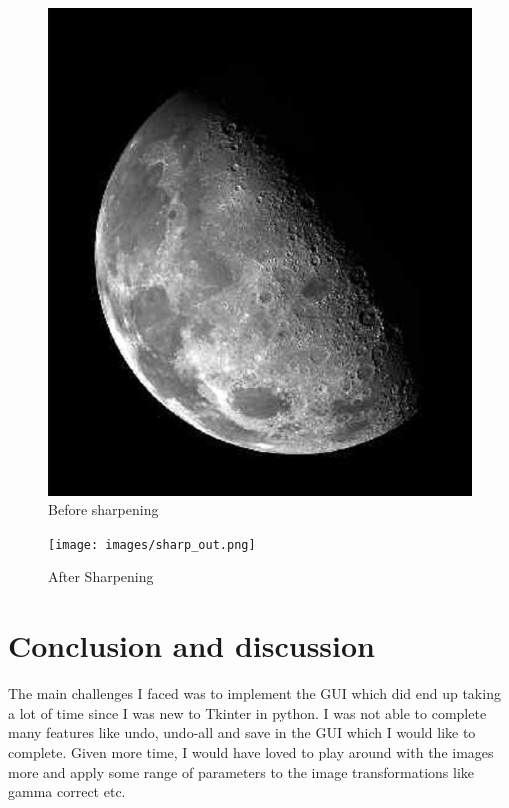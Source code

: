 \documentclass[conference]{IEEEtran}
\begin{document}
{{\begin{enumerate}
\begin{figure}[htbp]
\centerline{\includegraphics[scale = 0.30]{images/sharp.jpg}}
\caption{Before sharpening}
\label{fig:sharp_1}
\end{figure}
    \begin{figure}[htbp]
\centerline{\texttt{[image: images/sharp\_out.png]}}
\caption{After Sharpening}
\label{fig:sharp_2}
\end{figure}

 \end{enumerate}

\section*{Conclusion and discussion}
The main challenges I faced was to implement the GUI which did end up taking  a lot of time since I was new to Tkinter in python. I was not able to complete many features like undo, undo-all and save in the GUI which I would like to complete. Given more time, I would have loved to play around with the images more and apply some range of parameters to the image transformations like gamma correct etc.


}}
\end{document}
